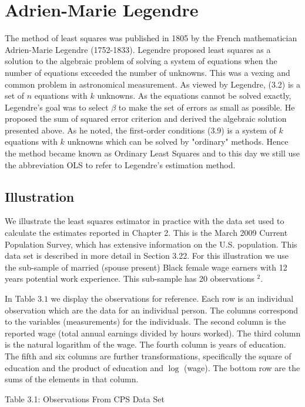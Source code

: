 \documentclass[10pt]{article}
\begin{document}
\section{Adrien-Marie Legendre}
The method of least squares was published in 1805 by the French mathematician Adrien-Marie Legendre (1752-1833). Legendre proposed least squares as a solution to the algebraic problem of solving a system of equations when the number of equations exceeded the number of unknowns. This was a vexing and common problem in astronomical measurement. As viewed by Legendre, (3.2) is a set of $n$ equations with $k$ unknowns. As the equations cannot be solved exactly, Legendre's goal was to select $\beta$ to make the set of errors as small as possible. He proposed the sum of squared error criterion and derived the algebraic solution presented above. As he noted, the first-order conditions (3.9) is a system of $k$ equations with $k$ unknowns which can be solved by "ordinary" methods. Hence the method became known as Ordinary Least Squares and to this day we still use the abbreviation OLS to refer to Legendre's estimation method.

\subsection{Illustration}
We illustrate the least squares estimator in practice with the data set used to calculate the estimates reported in Chapter 2. This is the March 2009 Current Population Survey, which has extensive information on the U.S. population. This data set is described in more detail in Section 3.22. For this illustration we use the sub-sample of married (spouse present) Black female wage earners with 12 years potential work experience. This sub-sample has 20 observations ${ }^{2}$.

In Table $3.1$ we display the observations for reference. Each row is an individual observation which are the data for an individual person. The columns correspond to the variables (measurements) for the individuals. The second column is the reported wage (total annual earnings divided by hours worked). The third column is the natural logarithm of the wage. The fourth column is years of education. The fifth and six columns are further transformations, specifically the square of education and the product of education and $\log$ (wage). The bottom row are the sums of the elements in that column.

Table 3.1: Observations From CPS Data Set
\end{document}
